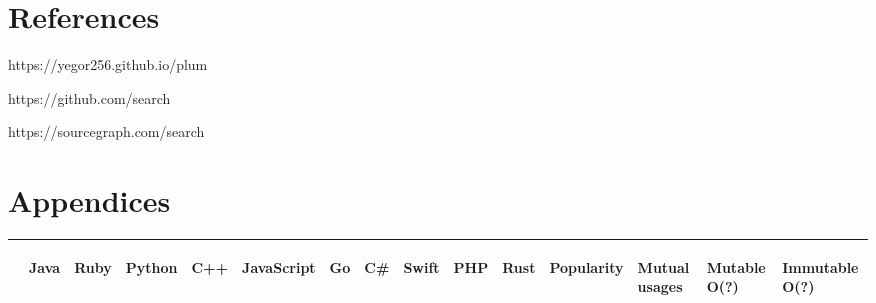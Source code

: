\documentclass[anonymous,sigplan,review,11pt,nonacm,natbib=false]{acmart}
\begin{document}
    \section{References}

    https://yegor256.github.io/plum

    https://github.com/search

    https://sourcegraph.com/search

    \section{Appendices}

    \label{table 1}

    \begin{table*}
        \begin{tabular}{lllllllllllllll}
            \hline
            & \begin{sideways}Java\end{sideways}
            & \begin{sideways}Ruby\end{sideways}
            & \begin{sideways}Python\end{sideways}
            & \begin{sideways}C++\end{sideways}
            & \begin{sideways}JavaScript\end{sideways}
            & \begin{sideways}Go\end{sideways}
            & \begin{sideways}C\#\end{sideways}
            & \begin{sideways}Swift\end{sideways}
            & \begin{sideways}PHP\end{sideways}
            & \begin{sideways}Rust\end{sideways}
            & \begin{sideways}Popularity\end{sideways}
            & \begin{sideways}Mutual usages\end{sideways}
            & \begin{sideways}Mutable O(?)\end{sideways}
            & \begin{sideways}Immutable O(?)\end{sideways}
            \\ \hline


\end{tabular}
\end{table*}
\end{document}
